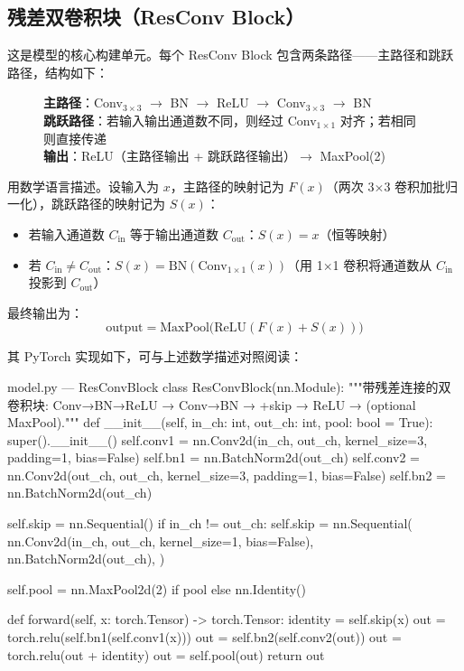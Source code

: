 \documentclass[12pt,a4paper]{ctexart}
\begin{document}
\subsection{残差双卷积块（ResConv Block）}

这是模型的核心构建单元。每个 ResConv Block 包含两条路径——主路径和跳跃路径，结构如下：

\begin{figure}[H]
\centering
\textbf{主路径}：Conv$_{3\times3}$ $\rightarrow$ BN $\rightarrow$ ReLU $\rightarrow$ Conv$_{3\times3}$ $\rightarrow$ BN \\
\textbf{跳跃路径}：若输入输出通道数不同，则经过 Conv$_{1\times1}$ 对齐；若相同则直接传递 \\
\textbf{输出}：ReLU（主路径输出 + 跳跃路径输出）$\rightarrow$ MaxPool(2)
\end{figure}

用数学语言描述。设输入为 $x$，主路径的映射记为 $F(x)$（两次 3$\times$3 卷积加批归一化），跳跃路径的映射记为 $S(x)$：

\begin{itemize}
\item 若输入通道数 $C_{\text{in}}$ 等于输出通道数 $C_{\text{out}}$：$S(x) = x$（恒等映射）
\item 若 $C_{\text{in}} \neq C_{\text{out}}$：$S(x) = \text{BN}(\text{Conv}_{1\times1}(x))$（用 1$\times$1 卷积将通道数从 $C_{\text{in}}$ 投影到 $C_{\text{out}}$）
\end{itemize}

最终输出为：
\[
\text{output} = \text{MaxPool}\big(\text{ReLU}(F(x) + S(x))\big)
\]

其 PyTorch 实现如下，可与上述数学描述对照阅读：

\begin{pythoncode}{model.py — ResConvBlock}
class ResConvBlock(nn.Module):
    """带残差连接的双卷积块: Conv→BN→ReLU → Conv→BN → +skip → ReLU → (optional MaxPool)."""
    def __init__(self, in_ch: int, out_ch: int, pool: bool = True):
        super().__init__()
        self.conv1 = nn.Conv2d(in_ch, out_ch, kernel_size=3, padding=1, bias=False)
        self.bn1 = nn.BatchNorm2d(out_ch)
        self.conv2 = nn.Conv2d(out_ch, out_ch, kernel_size=3, padding=1, bias=False)
        self.bn2 = nn.BatchNorm2d(out_ch)

        self.skip = nn.Sequential()
        if in_ch != out_ch:
            self.skip = nn.Sequential(
                nn.Conv2d(in_ch, out_ch, kernel_size=1, bias=False),
                nn.BatchNorm2d(out_ch),
            )

        self.pool = nn.MaxPool2d(2) if pool else nn.Identity()

    def forward(self, x: torch.Tensor) -> torch.Tensor:
        identity = self.skip(x)
        out = torch.relu(self.bn1(self.conv1(x)))
        out = self.bn2(self.conv2(out))
        out = torch.relu(out + identity)
        out = self.pool(out)
        return out
\end{pythoncode}
\end{document}
